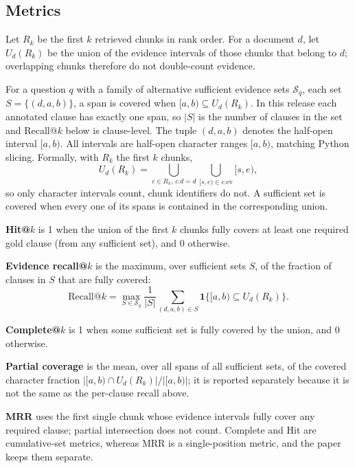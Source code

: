 \documentclass[conference]{IEEEtran}
\begin{document}
\subsection{Metrics}
Let $R_k$ be the first $k$ retrieved chunks in rank order. For a document $d$, let $U_d(R_k)$ be the union of the evidence intervals of those chunks that belong to $d$; overlapping chunks therefore do not double-count evidence.

For a question $q$ with a family of alternative sufficient evidence sets $\mathcal{S}_q$, each set $S=\{(d,a,b)\}$, a span is covered when $[a,b)\subseteq U_d(R_k)$. In this release each annotated clause has exactly one span, so $|S|$ is the number of clauses in the set and Recall@$k$ below is clause-level. The tuple $(d,a,b)$ denotes the half-open interval $[a,b)$. All intervals are half-open character ranges $[a,b)$, matching Python slicing. Formally, with $R_k$ the first $k$ chunks,
\begin{equation}
U_d(R_k)=\bigcup_{c\in R_k,\,c.d=d}\bigcup_{[s,e)\in c.\mathrm{ev}}[s,e),
\end{equation}
so only character intervals count, chunk identifiers do not. A sufficient set is covered when every one of its spans is contained in the corresponding union.

\textbf{Hit@$k$} is 1 when the union of the first $k$ chunks fully covers at least one required gold clause (from any sufficient set), and 0 otherwise.

\textbf{Evidence recall@$k$} is the maximum, over sufficient sets $S$, of the fraction of clauses in $S$ that are fully covered:
\begin{equation}
\mathrm{Recall@}k=\max_{S\in\mathcal{S}_q}\frac{1}{|S|}\sum_{(d,a,b)\in S}\mathbf{1}\{[a,b)\subseteq U_d(R_k)\}.
\end{equation}

\textbf{Complete@$k$} is 1 when some sufficient set is fully covered by the union, and 0 otherwise.

\textbf{Partial coverage} is the mean, over all spans of all sufficient sets, of the covered character fraction $|[a,b)\cap U_d(R_k)|/|[a,b)|$; it is reported separately because it is not the same as the per-clause recall above.

\textbf{MRR} uses the first single chunk whose evidence intervals fully cover any required clause; partial intersection does not count. Complete and Hit are cumulative-set metrics, whereas MRR is a single-position metric, and the paper keeps them separate.
\end{document}
